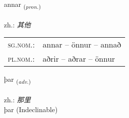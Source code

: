 \documentclass[frontgrid, backgrid]{flacards}\usepackage[]{graphicx}\usepackage[]{xcolor}
\begin{document}
\renewcommand{\blhead}{\vskip5pt {\small\bfseries\footnotesize Fornafn | 代词 }}
\renewcommand{\bcfoot}{\vskip5pt \hspace{2pt}{\small\bfseries\footnotesize 1K}}


{annar \small{\textsubscript{(\textit{pron.})}} \\[1ex] %
\textphonetic{[anar]} \\
zh.: \emph{其他} \\  [2ex]
\renewcommand*{\arraystretch}{0.8}
\begin{tabular}{ll}
\textsc{sg.nom.}: & annar  --  önnur -- annað \\ 
\textsc{pl.nom.}: & aðrir -- aðrar -- önnur
\end{tabular}
}


\renewcommand{\flhead}{\vskip5pt \fboxsep=0pt {\small\bfseries\footnotesize Atviksorð | 副词}}
\renewcommand{\fcfoot}{\vskip5pt \fboxsep=0pt \hspace{2pt}{\small\bfseries\footnotesize 1K}}

\renewcommand{\blhead}{\vskip5pt {\small\bfseries\footnotesize Atviksorð | 副词 }}
\renewcommand{\bcfoot}{\vskip5pt \hspace{2pt}{\small\bfseries\footnotesize 1K}}


{þar \small{\textsubscript{(\textit{adv.})}} \\[1ex]
\textphonetic{[θaːr]} \\
zh.: \emph{那里} \\  [2ex]
þar (Indeclinable)}


\renewcommand{\flhead}{\vskip5pt \fboxsep=0pt {\small\bfseries\footnotesize Forsetning | 介词}}
\renewcommand{\fcfoot}{\vskip5pt \fboxsep=0pt \hspace{2pt}{\small\bfseries\footnotesize 1K}}

\renewcommand{\blhead}{\vskip5pt {\small\bfseries\footnotesize Forsetning | 介词 }}
\renewcommand{\bcfoot}{\vskip5pt \hspace{2pt}{\small\bfseries\footnotesize 1K}}
\end{document}
